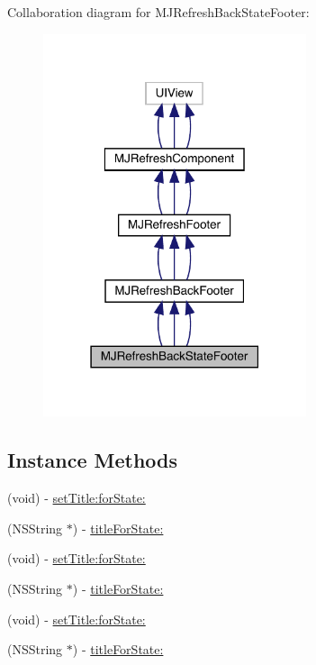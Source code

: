 Collaboration diagram for M\+J\+Refresh\+Back\+State\+Footer\+:\nopagebreak
\begin{figure}[H]
\begin{center}
\leavevmode
\includegraphics[width=219pt]{interface_m_j_refresh_back_state_footer__coll__graph}
\end{center}
\end{figure}
\subsection*{Instance Methods}
\begin{DoxyCompactItemize}
\item 
(void) -\/ \mbox{\hyperlink{interface_m_j_refresh_back_state_footer_ad98ad72f87b75b7738c7512c6e6bb7b7}{set\+Title\+:for\+State\+:}}
\item 
(N\+S\+String $\ast$) -\/ \mbox{\hyperlink{interface_m_j_refresh_back_state_footer_a7c801452fb33298447430304f0fe75cf}{title\+For\+State\+:}}
\item 
(void) -\/ \mbox{\hyperlink{interface_m_j_refresh_back_state_footer_ad98ad72f87b75b7738c7512c6e6bb7b7}{set\+Title\+:for\+State\+:}}
\item 
(N\+S\+String $\ast$) -\/ \mbox{\hyperlink{interface_m_j_refresh_back_state_footer_a7c801452fb33298447430304f0fe75cf}{title\+For\+State\+:}}
\item 
(void) -\/ \mbox{\hyperlink{interface_m_j_refresh_back_state_footer_ad98ad72f87b75b7738c7512c6e6bb7b7}{set\+Title\+:for\+State\+:}}
\item 
(N\+S\+String $\ast$) -\/ \mbox{\hyperlink{interface_m_j_refresh_back_state_footer_a7c801452fb33298447430304f0fe75cf}{title\+For\+State\+:}}
\end{DoxyCompactItemize}
